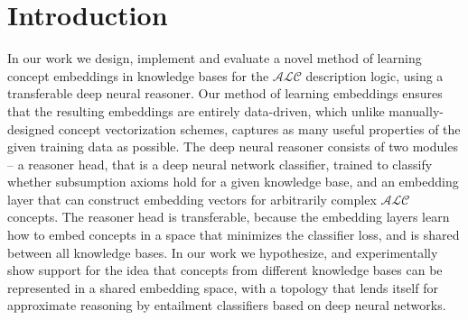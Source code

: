 
\newcommand{\tw}[1]{\texttt{#1}} %

\newcommand{\plusplus}{\raisebox{0.5ex}{\tiny\textbf{++}}}
\newcommand{\cpp}{C\plusplus}
\newcommand{\factpp}{FaCT\plusplus}

\newcommand{\EL}{\mathcal{EL}}
\newcommand{\ALC}{\mathcal{ALC}}
\newcommand{\SROIQD}{\mathcal{SROIQ^{(D)}}}
\newcommand{\SHOIND}{\mathcal{SHOIN^{(D)}}}
\newcommand{\sub}{\sqsubseteq}
\newcommand{\dland}{\sqcap}
\newcommand{\dlor}{\sqcup}
\newcommand{\dldomain}{\Delta^\mathcal{I}}
\newcommand{\Protege}{Protégé}

\newcommand{\Real}{\mathbb{R}}
\newcommand{\Emb}{\mathbb{R}^{N_e}}
\newcommand{\Nat}{\mathbb{N}}

\newcommand{\bfA}{\mathbf{A}}
\newcommand{\bfC}{\mathbf{C}}
\newcommand{\bfT}{\mathbf{T}}
\newcommand{\bfW}{\mathbf{W}}

\newcommand{\calK}{\mathcal{K}}
\newcommand{\calA}{\mathcal{A}}
\newcommand{\calT}{\mathcal{T}}
\newcommand{\calI}{\mathcal{I}}
\newcommand{\calO}{\mathcal{O}}
\newcommand{\calN}{\mathcal{N}}
\newcommand{\calU}{\mathcal{U}}
\newcommand{\KB}{\mathcal{K}}

\newcommand{\nnflatten}{\text{flatten}}
\newcommand{\nnimap}{\mathit{IM}}
\newcommand{\nnelu}{\text{ELU}}
\newcommand{\nn}{\mathit{NN}}


\chapter{Introduction}
\label{chap:intro}

In our work we design, implement and evaluate a novel method of learning concept embeddings in knowledge bases for the $\ALC$ description logic, using a transferable deep neural reasoner.
Our method of learning embeddings ensures that the resulting embeddings are entirely data-driven, which unlike manually-designed concept vectorization schemes, captures as many useful properties of the given training data as possible.
The deep neural reasoner consists of two modules -- a reasoner head, that is a deep neural network classifier, trained to classify whether subsumption axioms hold for a given knowledge base, and an embedding layer that can construct embedding vectors for arbitrarily complex $\ALC$ concepts. 
The reasoner head is transferable, because the embedding layers learn how to embed concepts in a space that minimizes the classifier loss, and is shared between all knowledge bases.
In our work we hypothesize, and experimentally show support for the idea that concepts from different knowledge bases can be represented in a shared embedding space, with a topology that lends itself for approximate reasoning by entailment classifiers based on deep neural networks.

